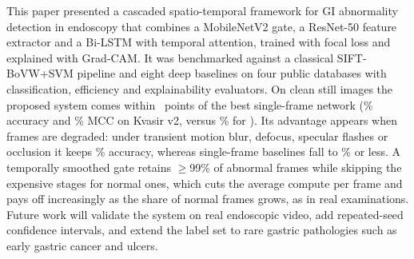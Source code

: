 This paper presented a cascaded spatio-temporal framework for GI abnormality detection in endoscopy that combines a
MobileNetV2 gate, a ResNet-50 feature extractor and a Bi-LSTM with temporal attention, trained with focal loss and
explained with Grad-CAM. It was benchmarked against a classical SIFT-BoVW+SVM pipeline and eight deep baselines on
four public databases with classification, efficiency and explainability evaluators. On clean still images the
proposed system comes within \Rgapbest\ points of the best single-frame network (\Rpropacc\% accuracy and \Rpropmcc\%
MCC on Kvasir v2, versus \Rbestbaseacc\% for \Rbestbase). Its
advantage appears when frames are degraded: under transient motion blur, defocus, specular flashes or occlusion it
keeps \Rrobtransient\% accuracy, whereas single-frame baselines fall to \Rrobbestbaseacc\% or less. A temporally
smoothed gate retains $\ge$99\% of abnormal frames while skipping the expensive stages for normal ones, which cuts
the average compute per frame and pays off increasingly as the share of normal frames grows, as in real examinations. Future work will
validate the system on real endoscopic video, add repeated-seed confidence intervals, and extend the label set to
rare gastric pathologies such as early gastric cancer and ulcers.
